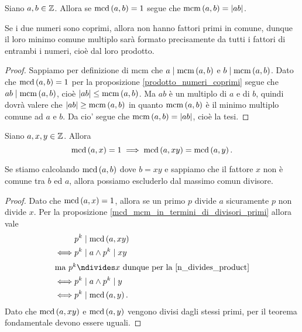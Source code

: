 \begin{proposition}\label{mcm_equals_product}
    Siano $a, b \in \mathbb{Z}$. Allora se $\operatorname{mcd}\left(a, b\right) = 1$ segue che $\operatorname{mcm}\left(a, b\right) = \left|ab\right|$.
\end{proposition}
\begin{intuition}
    Se i due numeri sono coprimi, allora non hanno fattori primi in comune, dunque il loro minimo comune multiplo sarà formato precisamente da tutti i fattori di entrambi i numeri, cioè dal loro prodotto.
\end{intuition}
\begin{proof}
    Sappiamo per definizione di mcm che $a \mid \operatorname{mcm}\left(a, b\right)$ e $b \mid \operatorname{mcm}\left(a, b\right)$. Dato che $\operatorname{mcd}\left(a, b\right) = 1$ per la proposizione \ref{prodotto_numeri_coprimi} segue che $ab \mid \operatorname{mcm}\left(a, b\right)$, cioè $\left|ab\right| \leq \operatorname{mcm}\left(a, b\right)$. Ma $ab$ è un multiplo di $a$ e di $b$, quindi dovrà valere che $\left|ab\right| \geq \operatorname{mcm}\left(a, b\right)$ in quanto $\operatorname{mcm}\left(a, b\right)$ è il minimo multiplo comune ad $a$ e $b$. Da cio' segue che $\operatorname{mcm}\left(a, b\right) = \left|ab\right|$, cioè la tesi.
\end{proof}

\begin{proposition} \label{mcd_togliere_fattori_non_comuni}
    Siano $a, x, y \in \mathbb{Z}$. Allora 
    \begin{equation}
        \operatorname{mcd}\left(a, x\right) = 1 \implies \operatorname{mcd}\left(a, xy\right) = \operatorname{mcd}\left(a, y\right).
    \end{equation}
\end{proposition}
\begin{intuition}
    Se stiamo calcolando $\operatorname{mcd}\left(a, b\right)$ dove $b = xy$ e sappiamo che il fattore $x$ non è comune tra $b$ ed $a$, allora possiamo escluderlo dal massimo comun divisore.
\end{intuition}
\begin{proof}
    Dato che $\operatorname{mcd}\left(a, x\right) = 1$, allora se un primo $p$ divide $a$ sicuramente $p$ non divide $x$. Per la proposizione \ref{mcd_mcm_in_termini_di_divisori_primi} allora vale
    \begin{alignat*}
        {1}
        &p^k \divides \mcd{a}{xy} \\ 
        \iff &p^k \divides a \land p^k \divides xy\\
        \intertext{ma $p^k \ndivides x$ dunque per la \ref{n_divides_product}}
        \iff &p^k \divides a \land p^k \divides y \\
        \iff &p^k \divides \mcd{a}{y}.
    \end{alignat*}
    Dato che $\operatorname{mcd}\left(a, xy\right)$ e $\operatorname{mcd}\left(a, y\right)$ vengono divisi dagli stessi primi, per il teorema fondamentale devono essere uguali.
\end{proof}

